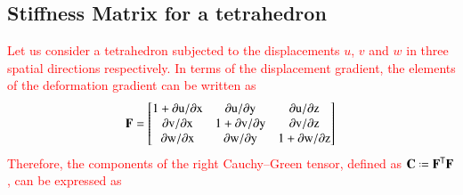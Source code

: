 \subsection{Stiffness Matrix for a tetrahedron}
\textcolor{red}{Let us consider a tetrahedron subjected to the displacements $u$, $v$ and $w$ in three spatial directions respectively. In terms of the displacement gradient, the elements of the deformation gradient can be written as}
\begin{equation}
\mathbf{F} =  
\begin{bmatrix}
1 + \mathrm{\partial u / \partial x} & \mathrm{\partial u / \partial y} & \mathrm{\partial u / \partial z} \\
\mathrm{\partial v / \partial x} & 1 + \mathrm{\partial v / \partial y} & \mathrm{\partial v / \partial z} \\
\mathrm{\partial w / \partial x} & \mathrm{\partial w / \partial y} & 1 + \mathrm{\partial w / \partial z}
\end{bmatrix}\\
\end{equation}	
\textcolor{red}{Therefore, the components of the right Cauchy--Green tensor, defined as $\mathbf{C}\defeq \mathbf{F}^\mathsf{T}\mathbf{F}$, can be expressed as}
